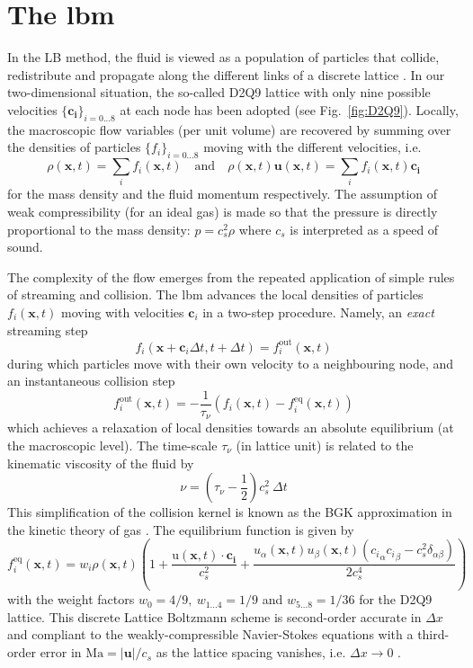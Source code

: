 \section{The \acl{lbm}}
\label{app:lbm}

In the LB method, the fluid is viewed as a population of particles that collide, redistribute and propagate along the different links of a discrete lattice . 
In our two-dimensional situation, the so-called D2Q9 lattice with only nine possible velocities $\{\mathbf{c_i}\}_{i=0...8}$ at each node has been adopted (see  Fig.~\ref{fig:D2Q9}).
Locally, the macroscopic flow variables (per unit volume) are recovered by summing over the densities of particles $\{f_i\}_{i=0...8}$ moving with the different velocities, i.e.
\[
\rho(\mathbf{x},t) = \sum_i f_i(\mathbf{x},t) \quad \mathrm{and}\quad \rho(\mathbf{x},t) \mathbf u(\mathbf{x},t) = \sum_i f_i(\mathbf{x},t) \mathbf{c_i}
\]
for the mass density and the fluid momentum respectively. The assumption of weak compressibility (for an ideal gas) is made so that the pressure is directly proportional to the mass density: $p = c_s^2 \rho$ where $c_s$ is interpreted as a speed of sound.  

%
The complexity of the flow emerges from the repeated application of simple rules of streaming and collision. The \ac{lbm} advances the local densities of particles $f_i(\mathbf{x},t)$ moving with velocities $\mathbf{c}_i$  in a two-step procedure. Namely, an \emph{exact} streaming step 
\[
f_i(\mathbf{x}+\mathbf{c}_i \Delta t, t + \Delta t) = f_i^{\mathrm{out}}(\mathbf{x},t)
\]
during which particles move with their own velocity to a neighbouring node, and an instantaneous collision step
\[
f_i^{\mathrm{out}}(\mathbf{x},t) = -\frac 1 {\tau_\nu} \left(f_i(\mathbf{x},t) - f_i^\mathrm{eq}(\mathbf{x},t) \right)
\]
which achieves a relaxation of local densities towards an absolute equilibrium (at the macroscopic level). The time-scale $\tau_\nu$ (in lattice unit) is related to the kinematic viscosity of the fluid by 
\[
\nu = \left( {\tau_\nu} - \frac 1 2 \right) c_s^2 ~\Delta t
\]
This simplification of the collision kernel is known as the BGK approximation in the kinetic theory of gas .
%
The equilibrium function is given by
\[
f_i^\mathrm{eq}(\mathbf{x},t) = w_i  \rho(\mathbf{x},t) \left( 1 + \frac{\mathrm u(\mathbf{x},t) \cdot \mathbf{c_i}}{c_s^2} +
\frac{u_\alpha(\mathbf{x},t) u_\beta(\mathbf{x},t)({c_i}_\alpha {c_i}_\beta - c_s^2 \delta_{\alpha\beta})}{2 c_s^4} \right)
\] 
with the weight factors $w_0=4/9,~w_{1...4} = 1/9$ and $w_{5...8}=1/36$ for the D2Q9 lattice. 
This discrete Lattice Boltzmann scheme is second-order accurate in $\Delta x $ and compliant to the weakly-compressible Navier-Stokes equations with a third-order error in $\mathrm{Ma}=|\mathbf{u}|/c_s$ as the lattice spacing vanishes, i.e. $\Delta x \to 0$ . 

